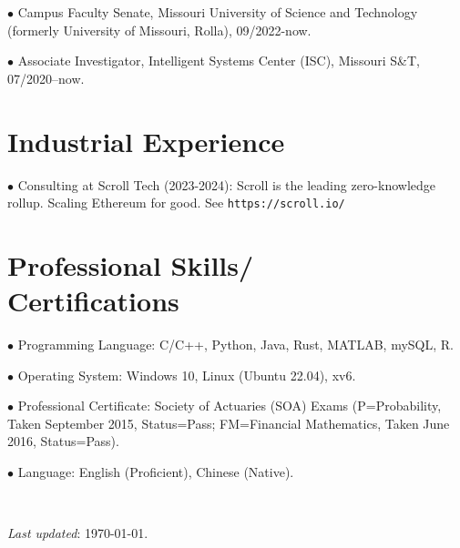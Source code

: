 \documentclass[margin,line]{res}
\begin{document}
\begin{resume}
$\bullet$ Campus Faculty Senate, Missouri University
of Science and Technology (formerly University of Missouri, Rolla), 09/2022-now.

$\bullet$ Associate Investigator, Intelligent Systems Center (ISC), Missouri S\&T, 07/2020--now. 


\section{\sc Industrial Experience}

$\bullet$ Consulting at Scroll Tech (2023-2024): Scroll is the leading zero-knowledge rollup. Scaling Ethereum for good. See \verb#https://scroll.io/#


\section{\sc Professional Skills/ \\ Certifications}

$\bullet$ Programming Language: C/C++, Python, Java, Rust, MATLAB, mySQL, R. 

$\bullet$ Operating System: Windows 10, Linux (Ubuntu 
 22.04), xv6.

$\bullet$ Professional Certificate: Society of Actuaries (SOA) Exams
(P=Probability, Taken September 2015, Status=Pass; FM=Financial Mathematics, Taken
June 2016, Status=Pass).

$\bullet$ Language: English (Proficient), Chinese (Native).


\

\textit{Last updated}: \today.

\end{resume}
\end{document}
